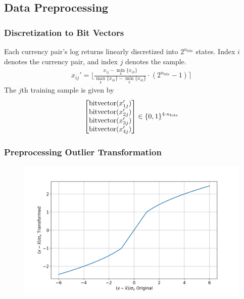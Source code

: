 \documentclass{beamer}
\begin{document}
\subsection{Data Preprocessing}
\begin{frame}
    \frametitle{Discretization to Bit Vectors}
    Each currency pair's log returns linearly discretized into \( 2^{n_\text{bits}} \) states.
    Index \( i \) denotes the currency pair, and index \( j \) denotes the sample.
    \begin{align}
        x_{ij}' = \bigg\lfloor \frac{x_{ij} - \min_k \{x_{ik}\}}{\max_k \{x_{ik}\} - \min_k \{x_{ik}\}} \cdot (2^{n_\text{bits}} - 1) \bigg\rceil
    \end{align}
    The \( j \)th training sample is given by
    \begin{align}
        \begin{bmatrix}
            \text{bitvector}(x_{1j}') \\
            \text{bitvector}(x_{2j}') \\
            \text{bitvector}(x_{3j}') \\
            \text{bitvector}(x_{4j}') \\
        \end{bmatrix}
        \in \{0,1\}^{4\cdot n_\text{bits}}
    \end{align}

\end{frame}

\begin{frame}
    \frametitle{Preprocessing Outlier Transformation}
    \begin{figure}
        \includegraphics[width=1\linewidth]{data_analysis/data_transformation.png}
    \end{figure}
\end{frame}
\end{document}
